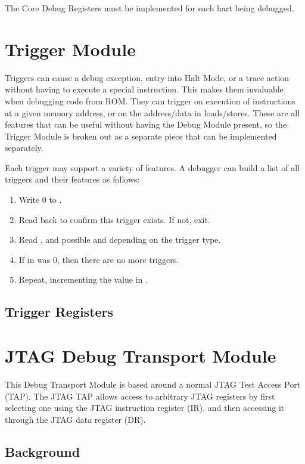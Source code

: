 \documentclass{article}
\newenvironment{steps}[1]
{
   \vspace{1ex}
   \noindent
   #1
   \begin{enumerate}[nosep]
}
{
   \end{enumerate}
   \vspace{1ex}
}
\begin{document}
The Core Debug Registers must be implemented for each hart being debugged.



\section{Trigger Module}

Triggers can cause a debug exception, entry into Halt Mode, or a trace action
without having to execute a special instruction. This makes them invaluable
when debugging code from ROM. They can trigger on execution of instructions at
a given memory address, or on the address/data in loads/stores.  These are all
features that can be useful without having the Debug Module present, so the
Trigger Module is broken out as a separate piece that can be implemented
separately.

\begin{steps}{Each trigger may support a variety of features. A debugger can
    build a list of all triggers and their features as follows:}
\item Write 0 to \Rtselect.
\item Read back \Rtselect to confirm this trigger exists. If not, exit.
\item Read \Rtdataone, and possible \Rtdatatwo and \Rtdatathree depending on the
    trigger type.
\item If \Ftype in \Rtdataone was 0, then there are no more triggers.
\item Repeat, incrementing the value in \Rtselect.
\end{steps}

\subsection{Trigger Registers}



\section{JTAG Debug Transport Module}

This Debug Transport Module is based around a normal JTAG Test Access Port
(TAP).  The JTAG TAP allows access to arbitrary JTAG registers by first
selecting one using the JTAG instruction register (IR), and then accessing it
through the JTAG data register (DR).

\subsection{Background}
\end{document}
